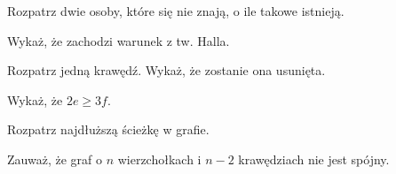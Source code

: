 
\begin{hints_list}
	\item Rozpatrz dwie osoby, które się nie znają, o ile takowe istnieją. 
	\item Wykaż, że zachodzi warunek z tw. Halla.
	\item Rozpatrz jedną krawędź. Wykaż, że zostanie ona usunięta. 
	\item Wykaż, że $2e \geqslant 3f$.
	\item Rozpatrz najdłuższą ścieżkę w grafie.
	\item Zauważ, że graf o $n$ wierzchołkach i $n-2$ krawędziach nie jest spójny.
\end{hints_list}